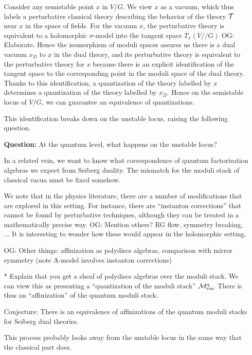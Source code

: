 \documentclass[11pt]{amsart}
\def\owen#1{{\textcolor{violet!65!black}{OG: {#1}}}}
\begin{document}
Consider any semistable point $x$ in $V/G$.
We view $x$ as a vacuum, which thus labels a perturbative classical theory describing the behavior of the theory $\mathcal T$ near $x$ in the space of fields. 
For the vacuum $x$, the perturbative theory is equivalent to a holomorphic $\sigma$-model into the tangent space $T_x (V//G)$ \owen{Elaborate}. 
Hence the isomorphism of moduli spaces assures us there is a dual vacuum $x_D$ to $x$ in the dual theory, and its perturbative theory is equivalent to the perturbative theory for $x$
because there is an explicit identification of the tangent space to the corresponding point in the moduli space of the dual theory.
Thanks to this identification, a quantization of the theory labelled by $x$ determines a quantization of the theory labelled by $x_D$.
Hence on the semistable locus of $V/G$, we can guarantee an equivalence of quantizations.

This identification breaks down on the unstable locus, raising the following question.

{\bf Question:}
At the quantum level, what happens on the unstable locus? 


In a related vein, we want to know what correspondence of quantum factorization algebras we expect from Seiberg duality. 
The mismatch for the moduli stack of classical vacua must be fixed somehow.

We note that in the physics literature, there are a number of modifications that are explored in this setting.
For instance, there are ``instanton corrections'' that cannot be found by perturbative techniques, although they can be treated in a mathematically precise way. 
\owen{Mention others? RG flow, symmetry breaking, ...}
It is interesting to wonder how these would appear in the holomorphic setting.

\owen{Other things: affinization as polydiscs algebras, comparison with mirror symmetry (note A-model involves instanton corrections)}



* Explain that you get a sheaf of polydiscs algebras over the moduli stack. We can view this as presenting a ``quantization of the moduli stack'' $\mathcal M_{vac}^{\rm q}$ There is thus an ``affinization'' of the quantum moduli stack.

Conjecture: There is an equivalence of affinizations of the quantum moduli stacks for Seiberg dual theories.

This process probably looks away from the unstable locus in the same way that the classical part does. 
\end{document}

